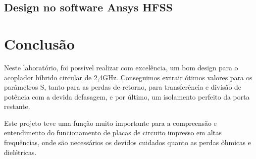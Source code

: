 \documentclass[article, oneside, oldfontcommands]{abntex2}
\begin{document}
\subsection{Design no software Ansys HFSS}


\section{Conclusão}

Neste laboratório, foi possível realizar com excelência, um bom design para o acoplador híbrido circular de 2,4GHz. Conseguimos extrair ótimos valores para os parâmetros S, tanto para as perdas de retorno, para transferência e divisão de potência com a devida defasagem, e por último, um isolamento perfeito da porta restante. 

Este projeto teve uma função muito importante para a compreensão e entendimento do funcionamento de placas de circuito impresso em altas frequências, onde são necessários os devidos cuidados quanto as perdas ôhmicas e dielétricas. 



\newpage

\end{document}
